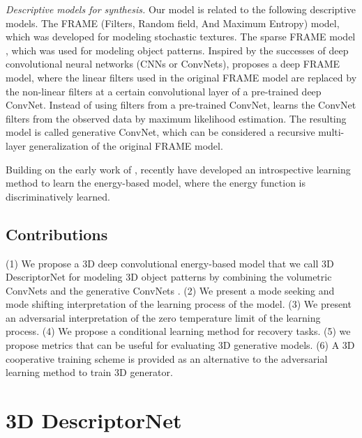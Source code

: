 \documentclass[10pt,twocolumn,letterpaper]{article}
\begin{document}
\textit{Descriptive models for synthesis.} 
Our model is related to the following descriptive models. The FRAME (Filters, Random field, And Maximum Entropy) \cite{zhu1998filters} model, which was developed for modeling  stochastic textures. The sparse FRAME model \cite{xie2015learning, xie2016inducing}, which was used for modeling object patterns. 
Inspired by the successes of deep convolutional neural networks (CNNs or ConvNets), \cite{lu2015learning} proposes a deep FRAME model, where the linear filters used in the original FRAME model are replaced by the non-linear filters at a certain convolutional layer of a pre-trained deep ConvNet. %
Instead of using filters from a pre-trained ConvNet, \cite{XieLuICML} learns the ConvNet filters from the observed data by maximum likelihood estimation. The resulting model is called generative ConvNet, which can be considered a recursive multi-layer generalization of the original FRAME model. 


Building on the early work of \cite{tu2007learning}, recently \cite{jin2017introspective, lazarow2017introspective} have developed an introspective learning method to learn the energy-based model, where the energy function is discriminatively learned. 

\subsection{Contributions}
(1) We propose a 3D deep convolutional energy-based model that we call  3D DescriptorNet for  modeling 3D object patterns by combining the volumetric ConvNets \cite{maturana2015voxnet} and the generative ConvNets \cite{XieLuICML}. (2) We present a mode seeking and mode shifting interpretation of the learning process of the model. (3) We present an adversarial interpretation of the zero temperature limit of the learning process. (4) We propose a conditional learning method for recovery tasks. (5) we  propose  metrics that can be useful for evaluating 3D generative models. (6) A 3D cooperative training scheme is provided as an alternative to the adversarial learning method to train 3D generator.    


\section{3D DescriptorNet}
 
\end{document}
